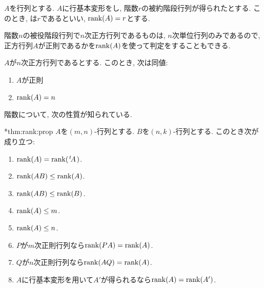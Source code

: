 \begin{definition}
  \label{def:rank}
  $A$を行列とする.
  $A$に行基本変形をし,
  階数$r$の被約階段行列が得られたとする.
  このとき, 
  は$r$であるといい,
  $\operatorname{rank}(A)=r$とする.
\end{definition}

階数$n$の被役階段行列で$n$次正方行列であるものは,
$n$次単位行列のみであるので,
正方行列$A$が正則であるかを$\operatorname{rank}(A)$を使って判定をすることもできる.
\begin{theorem}
  \label{thm:rank:regular}
  \indexforcriterionofregularity%
  $A$が$n$次正方行列であるとする.
  このとき, 次は同値:
  \begin{enumerate}
  \item\label{thm:rank:regular:reg}
    $A$が正則
  \item\label{thm:rank:regular:rank}
    $\operatorname{rank}(A)=n$
  \end{enumerate}
\end{theorem}


階数について, 次の性質が知られている.


\begin{theorem}
  \provelater**{thm:rank:prop}
  \label{thm:rank:prop}
  $A$を$(m,n)$-行列とする.
  $B$を$(n,k)$-行列とする.
  このとき次が成り立つ:
  \begin{enumerate}
  \item
    \label{thm:rank:prop:trans}
    $\operatorname{rank}(A)=\operatorname{rank}({\left.^{t}\!A\right.})$.
  \item
    \label{thm:rank:prop:left}
    $\operatorname{rank}(AB)\leq\operatorname{rank}(A)$.
  \item
    \label{thm:rank:prop:right}
    $\operatorname{rank}(AB)\leq\operatorname{rank}(B)$.
  \item
    \label{thm:rank:prop:row}
    $\operatorname{rank}(A)\leq m$.
  \item
    \label{thm:rank:prop:col}
    $\operatorname{rank}(A)\leq n$.
  \item
    $P$が$m$次正則行列なら$\operatorname{rank}(PA)=\operatorname{rank}(A)$.
  \item
    \label{thm:rank:prop:regularright}
    $Q$が$n$次正則行列なら$\operatorname{rank}(AQ)=\operatorname{rank}(A)$.
  \item
    \label{thm:rank:prop:fund}
    $A$に行基本変形を用いて$A'$が得られるなら$\operatorname{rank}(A)=\operatorname{rank}(A')$.
  \end{enumerate}
\end{theorem}

